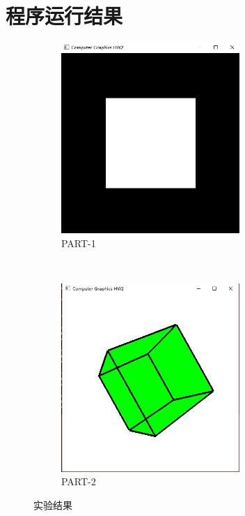 \documentclass{article}
\begin{document}
	\section{程序运行结果}
	\begin{figure}[H]
		\centering
		\begin{subfigure}{0.45\textwidth}
			\includegraphics[width=192pt]{../results/1.png}
			\caption{PART-1}
		\end{subfigure}
		~
		\begin{subfigure}{0.45\textwidth}
			\includegraphics[width=192pt]{../results/2.png}
			\caption{PART-2}
		\end{subfigure}
		\caption{实验结果}
	\end{figure}
\end{document}
